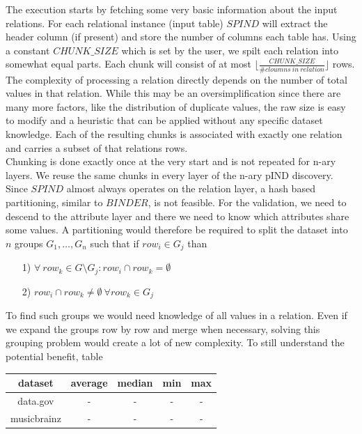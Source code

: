 \noindent The execution starts by fetching some very basic information about the input relations. For each relational instance (input table) $SPIND$ will extract the header column (if present) and store the number of columns each table has. Using a constant $CHUNK\_SIZE$ which is set by the user, we spilt each relation into somewhat equal parts. Each chunk will consist of at most $\lfloor \frac{CHUNK\_SIZE}{\# cloumns \: in \: relation} \rfloor$ rows. The complexity of processing a relation directly depends on the number of total values in that relation. While this may be an oversimplification since there are many more factors, like the distribution of duplicate values, the raw size is easy to modify and a heuristic that can be applied without any specific dataset knowledge. Each of the resulting chunks is associated with exactly one relation and carries a subset of that relations rows. \\

\noindent Chunking is done exactly once at the very start and is not repeated for n-ary layers. We reuse the same chunks in every layer of the n-ary pIND discovery. \\

\noindent Since $SPIND$ almost always operates on the relation layer, a hash based partitioning, similar to $BINDER$, is not feasible. For the validation, we need to descend to the attribute layer and there we need to know which attributes share some values. A partitioning would therefore be required to split the dataset into $n$ groups $G_1, \dots, G_n$ such that if $row_i \in G_j$ than 
\begin{itemize}
    \item[1)] $\forall \: row_k \in G \setminus G_j : row_i \cap row_k = \emptyset$
    \item[2)] $row_i \cap row_k \not = \emptyset \: \forall row_k \in G_j$
\end{itemize}
To find such groups we would need knowledge of all values in a relation. Even if we expand the groups row by row and merge when necessary, solving this grouping problem would create a lot of new complexity. To still understand the potential benefit, table 

\begin{center}
    \begin{tabular}{c|c|c|c|c} 
     dataset & average & median & min & max\\ 
     \hline\hline
     data.gov & - & - & - & -\\ 
     \hline
     musicbrainz & - & - & - & -\\
    \end{tabular}
\end{center}

